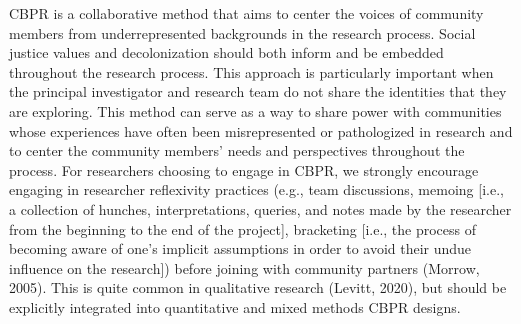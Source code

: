 \documentclass[
  11pt,
]{book}
\begin{document}
CBPR is a collaborative method that aims to center the voices of community members from underrepresented backgrounds in the research process. Social justice values and decolonization should both inform and be embedded throughout the research process. This approach is particularly important when the principal investigator and research team do not share the identities that they are exploring. This method can serve as a way to share power with communities whose experiences have often been misrepresented or pathologized in research and to center the community members' needs and perspectives throughout the process. For researchers choosing to engage in CBPR, we strongly encourage engaging in researcher reflexivity practices (e.g., team discussions, memoing {[}i.e., a collection of hunches, interpretations, queries, and notes made by the researcher from the beginning to the end of the project{]}, bracketing {[}i.e., the process of becoming aware of one's implicit assumptions in order to avoid their undue influence on the research{]}) before joining with community partners (Morrow, 2005). This is quite common in qualitative research (Levitt, 2020), but should be explicitly integrated into quantitative and mixed methods CBPR designs.
\end{document}
